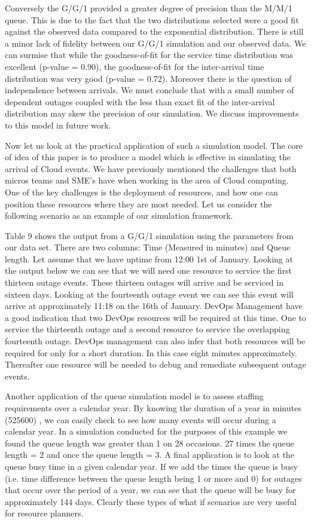 \documentclass[5p]{elsarticle}
\begin{document}
Conversely the G/G/1 provided a greater degree of precision than the M/M/1 queue. This is due to the fact that the two distributions selected were a good fit against the observed data compared to the exponential distribution. There is still a minor lack of fidelity between our G/G/1 simulation and our observed data. We can surmise that while the goodness-of-fit for the service time distribution 
was excellent (p-value = 0.90), the goodness-of-fit for the inter-arrival time distribution was very good (p-value = 0.72). Moreover there is the question of independence between arrivals. We must conclude that with a small number of dependent outages coupled with the less than exact fit of the inter-arrival distribution may skew the precision of our simulation. We discuss improvements to this model in future work.

Now let us look at the practical application of such a simulation model. The core of idea of this paper is to produce a model which is effective in simulating the arrival of Cloud events. We have previously mentioned the challenges that both micros teams and SME's have when working in the area of Cloud computing. One of the key challenges is the deployment of resources, and how one can position these resources where they are most needed. Let us consider the following scenario as an example of our simulation framework. 

Table 9 shows the output from a G/G/1 simulation using the parameters from our data set. There are two columns: Time (Measured in minutes) and Queue length. Let assume that  we have uptime from 12:00 1st of January. Looking at the output below we can see that we will need one resource to service the first  thirteen outage events. These thirteen outages will arrive and be serviced in sixteen days. Looking at the fourteenth outage event we can see this event will arrive at approximately 11:18 on the 16th of January. DevOps Management have a good indication that two DevOps resources will be required at this time.  One to service the thirteenth outage and a second resource to service the overlapping fourteenth outage. DevOps management can also infer that both resources will be required for only for a short duration. In this case eight minutes approximately. Thereafter one resource will be needed to debug and remediate subsequent outage events.

Another application of the queue simulation model is to assess staffing requirements over a calendar year. By knowing the duration of a year in minutes (525600) , we can easily check to see how many events will occur during a calendar year. In a simulation conducted for the purposes of this example we found the queue length was greater than 1 on 28 occasions. 27 times the queue length = 2 and once the queue length = 3. A final application is to look at the queue busy time in a given calendar year. If we add the times the queue is busy (i.e. time difference between the queue length being 1 or more and 0) for outages that occur over the period of a year, we can see that the queue will be busy for approximately 144 days. Clearly these types of what if scenarios are very useful for resource planners.
\end{document}
